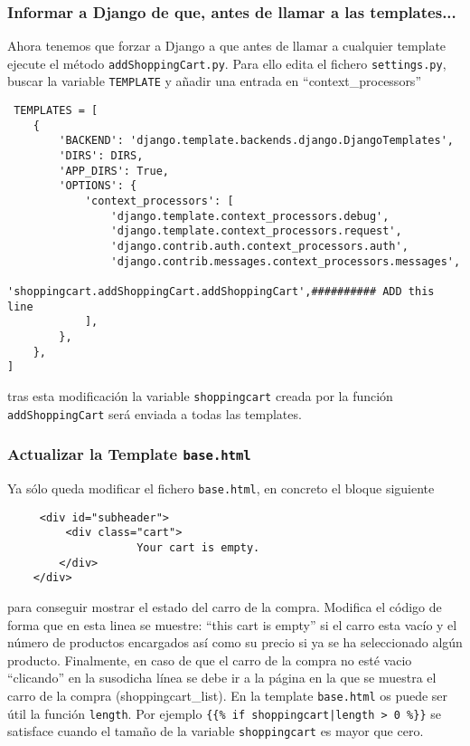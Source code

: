 \documentclass[12pt]{article} %
\newcommand{\ttt}[1]{\texttt{#1}}%
\newcommand{\hhh}[1]{\texttt{#1}}%
\newcommand{\settings}{\texttt{settings.py}}%
\begin{document}
\subsubsection{Informar a Django de que, antes de llamar a las templates...}

Ahora tenemos que forzar a Django a que antes de llamar a cualquier template ejecute el método \ttt{addShoppingCart.py}. Para ello edita el fichero \settings{}, buscar la variable \ttt{TEMPLATE} y añadir una entrada en ``context\_processors''

\begin{lstlisting}
 TEMPLATES = [
    {
        'BACKEND': 'django.template.backends.django.DjangoTemplates',
        'DIRS': DIRS,
        'APP_DIRS': True,
        'OPTIONS': {
            'context_processors': [
                'django.template.context_processors.debug',
                'django.template.context_processors.request',
                'django.contrib.auth.context_processors.auth',
                'django.contrib.messages.context_processors.messages',
                'shoppingcart.addShoppingCart.addShoppingCart',########## ADD this line
            ],
        },
    },
]
\end{lstlisting}
tras esta modificación la variable \ttt{shoppingcart} creada por la función \ttt{addShoppingCart} será enviada a todas las templates.

\subsubsection{Actualizar la Template \hhh{base.html}}

Ya sólo queda modificar el fichero \hhh{base.html}, en concreto el bloque siguiente
\begin{lstlisting}
     <div id="subheader">
         <div class="cart">
                    Your cart is empty.
        </div>
    </div>
\end{lstlisting}
para conseguir mostrar el estado del carro de la compra. Modifica el código de forma que en esta linea se muestre: ``this cart is empty'' si el carro esta vacío y el número de productos encargados así como su precio si ya se ha seleccionado algún producto. Finalmente, en caso de que el carro de la compra no esté vacio ``clicando'' en la susodicha línea se debe ir a la página en la que se muestra el carro de la compra (shoppingcart\_list). En la template
\hhh{base.html} os puede ser útil la función \ttt{length}. Por ejemplo \ttt{\{\{\% if shoppingcart|length > 0 \%\}\}} se satisface cuando el tamaño de la variable \ttt{shoppingcart} es mayor que cero.
\end{document}
